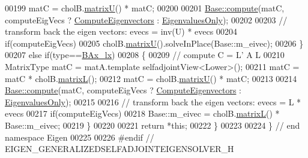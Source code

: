 \begin{DoxyCode}
00199     matC = cholB.\hyperlink{group___cholesky___module_a18a390f085567e650e8345cc7e7c0df8}{matrixU}() * matC;
00200 
00201     \hyperlink{group___eigenvalues___module_a88bcdc24112efa7c4d2ebb3476efcbe9}{Base::compute}(matC, computeEigVecs ? \hyperlink{group__enums_ggae3e239fb70022eb8747994cf5d68b4a9ada93d8885bde32b876ba4af01d3292cc}{ComputeEigenvectors} : 
      \hyperlink{group__enums_ggae3e239fb70022eb8747994cf5d68b4a9ad0c82cf0a9daf2a63bb6e2f10d51f69c}{EigenvaluesOnly});
00202 
00203     \textcolor{comment}{// transform back the eigen vectors: evecs = inv(U) * evecs}
00204     \textcolor{keywordflow}{if}(computeEigVecs)
00205       cholB.\hyperlink{group___cholesky___module_a18a390f085567e650e8345cc7e7c0df8}{matrixU}().solveInPlace(Base::m\_eivec);
00206   \}
00207   \textcolor{keywordflow}{else} \textcolor{keywordflow}{if}(type==\hyperlink{group__enums_ggae3e239fb70022eb8747994cf5d68b4a9a5b64c528c90483f0b716018cad0143f8}{BAx\_lx})
00208   \{
00209     \textcolor{comment}{// compute C = L' A L}
00210     MatrixType matC = matA.template selfadjointView<Lower>();
00211     matC = matC * cholB.\hyperlink{group___cholesky___module_a7f4a3eedbf82e7ce2d6bf0dcd84cdfa3}{matrixL}();
00212     matC = cholB.\hyperlink{group___cholesky___module_a18a390f085567e650e8345cc7e7c0df8}{matrixU}() * matC;
00213 
00214     \hyperlink{group___eigenvalues___module_a88bcdc24112efa7c4d2ebb3476efcbe9}{Base::compute}(matC, computeEigVecs ? \hyperlink{group__enums_ggae3e239fb70022eb8747994cf5d68b4a9ada93d8885bde32b876ba4af01d3292cc}{ComputeEigenvectors} : 
      \hyperlink{group__enums_ggae3e239fb70022eb8747994cf5d68b4a9ad0c82cf0a9daf2a63bb6e2f10d51f69c}{EigenvaluesOnly});
00215 
00216     \textcolor{comment}{// transform back the eigen vectors: evecs = L * evecs}
00217     \textcolor{keywordflow}{if}(computeEigVecs)
00218       Base::m\_eivec = cholB.\hyperlink{group___cholesky___module_a7f4a3eedbf82e7ce2d6bf0dcd84cdfa3}{matrixL}() * Base::m\_eivec;
00219   \}
00220 
00221   \textcolor{keywordflow}{return} *\textcolor{keyword}{this};
00222 \}
00223 
00224 \} \textcolor{comment}{// end namespace Eigen}
00225 
00226 \textcolor{preprocessor}{#endif // EIGEN\_GENERALIZEDSELFADJOINTEIGENSOLVER\_H}
\end{DoxyCode}

